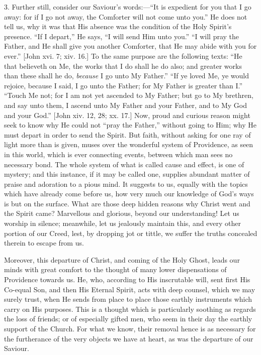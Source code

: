 3. Further still, consider our Saviour's words:—``It is
expedient for you that I go away: for if I go not away, the Comforter
will not come unto you.'' He does not tell us, why it was that His
absence was the condition of the Holy Spirit's presence. ``If I
depart,'' He says, ``I will send Him unto you.'' ``I
will pray the Father, and He shall give you another Comforter, that He
may abide with you for ever.'' [John xvi. 7; xiv. 16.] To the same
purpose are the following texts: ``He that believeth on Me, the
works that I do shall he do also; and greater works than these shall he
do, \emph{because} I go unto My Father.'' ``If ye loved Me, ye
would rejoice, because I said, I go unto the Father; for My Father is
greater than I.'' ``Touch Me not; for I am not yet ascended to
My Father; but go to My brethren, and say unto them, I ascend unto My
Father and your Father, and to My God and your God.'' [John xiv.
12, 28; xx. 17.] Now, proud and curious reason might seek to know why He
could not ``pray the Father,'' without going to Him; why He must
depart in order to send the Spirit. But faith, without asking for one
ray of light more than is given, muses over the wonderful system of
Providence, as seen in this world, which is ever connecting events,
between which man sees no necessary bond. The whole system of what is
called cause and effect, is one of mystery; and this instance, if it may
be called one, supplies abundant matter of praise and adoration to a
pious mind. It suggests to us, equally with the topics which have
already come before us, how very much our knowledge of God's ways is but
on the surface. What are those deep hidden reasons why Christ went and
the Spirit came? Marvellous and glorious, beyond our understanding! Let
us worship in silence; meanwhile, let us jealously maintain this, and
every other portion of our Creed, lest, by dropping jot or tittle, we
suffer the truths concealed therein to escape from us.

Moreover, this departure of Christ, and coming of the Holy Ghost,
leads our minds with great comfort to the thought of many lower
dispensations of Providence towards us. He, who, according to His
inscrutable will, sent first His Co-equal Son, and then His Eternal
Spirit, acts with deep counsel, which we may surely trust, when He sends
from place to place those earthly instruments which carry on His
purposes. This is a thought which is particularly soothing as regards
the loss of friends; or of especially gifted men, who seem in their day
the earthly support of the Church. For what we know, their removal hence
is as necessary for the furtherance of the very objects we have at
heart, as was the departure of our Saviour.

